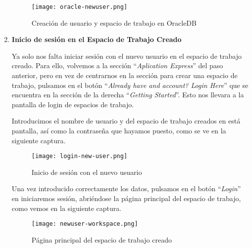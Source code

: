 \begin{enumerate}
    \begin{figure}[ht]
        \centering
        \texttt{[image: oracle-newuser.png]}
        \caption{Creación de usuario y espacio de trabajo en OracleDB}
    \end{figure}

    \item \textbf{Inicio de sesión en el Espacio de Trabajo Creado}

    Ya solo nos falta iniciar sesión con el nuevo usuario en el espacio de trabajo creado. Para ello, volvemos a la sección ``\textit{Aplication Express}'' del paso anterior, pero en vez de centrarnos en la sección para crear una espacio de trabajo, pulsamos en el botón ``\textit{Already have and account? Login Here}'' que se encuentra en la sección de la derecha ``\textit{Getting Started}''. Esto nos llevara a la pantalla de login de espacios de trabajo.

    Introducimos el nombre de usuario y del espacio de trabajo creados en está pantalla, así como la contraseña que hayamos puesto, como se ve en la siguiente captura.

     \begin{figure}[ht]
        \centering
        \texttt{[image: login-new-user.png]}
        \caption{Inicio de sesión con el nuevo usuario}
    \end{figure}

    Una vez introducido correctamente los datos, pulsamos en el botón ``\textit{Login}'' en iniciaremos sesión, abriéndose la página principal del espacio de trabajo, como vemos en la siguiente captura.

    \begin{figure}[ht]
        \centering
        \texttt{[image: newuser-workspace.png]}
        \caption{Página principal del espacio de trabajo creado}
    \end{figure}
\end{enumerate}







\newpage



